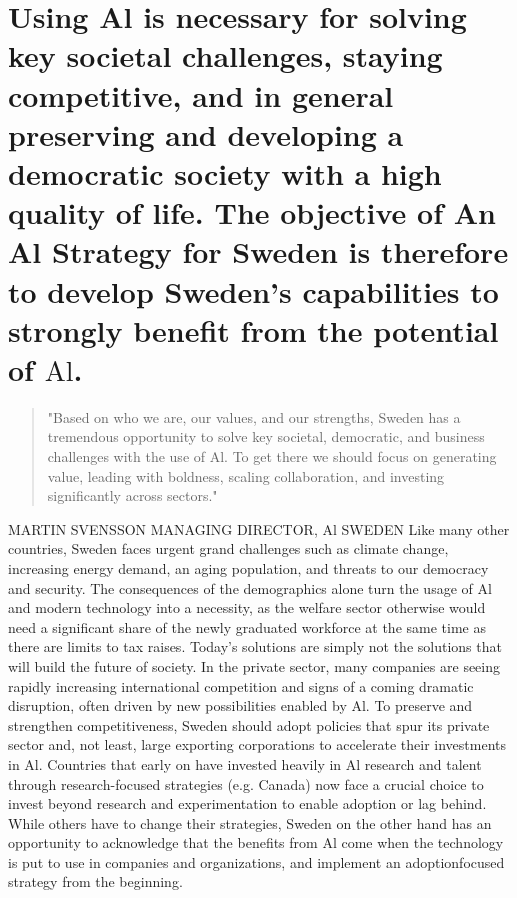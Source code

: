 \section*{Using Al is necessary for solving key societal challenges, staying competitive, and in general preserving and developing a democratic society with a high quality of life. The objective of An Al Strategy for Sweden is therefore to develop Sweden's capabilities to strongly benefit from the potential of \(\mathrm{Al}\).}
\begin{abstract}
"Based on who we are, our values, and our strengths, Sweden has a tremendous opportunity to solve key societal, democratic, and business challenges with the use of Al. To get there we should focus on generating value, leading with boldness, scaling collaboration, and investing significantly across sectors."
\end{abstract}
MARTIN SVENSSON
MANAGING DIRECTOR, Al SWEDEN
Like many other countries, Sweden faces urgent grand challenges such as climate change, increasing energy demand, an aging population, and threats to our democracy and security. The consequences of the demographics alone turn the usage of Al and modern technology into a necessity, as the welfare sector otherwise would need a significant share of the newly graduated workforce at the same time as there are limits to tax raises. Today's solutions are simply not the solutions that will build the future of society.
In the private sector, many companies are seeing rapidly increasing international competition and signs of a coming dramatic disruption, often driven by new possibilities enabled by Al. To preserve and strengthen competitiveness, Sweden should adopt policies that spur its private sector and, not least, large exporting corporations to accelerate their investments in Al.
Countries that early on have invested heavily in Al research and talent through research-focused strategies (e.g. Canada) now face a crucial choice to invest beyond research and experimentation to enable adoption or lag behind. While others have to change their strategies, Sweden on the other hand has an opportunity to acknowledge that the benefits from Al come when the technology is put to use in companies and organizations, and implement an adoptionfocused strategy from the beginning.

